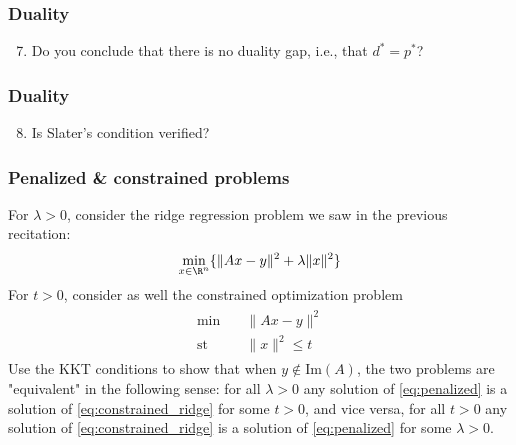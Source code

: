 \documentclass{beamer}
\begin{document}
\begin{frame}[t] 
\frametitle{Duality}
\vspace{-5pt}
\begin{enumerate}
\setcounter{enumi}{6}
\item Do you conclude that there is no duality gap, i.e., that $d^* = p^*$?
\end{enumerate}
\end{frame}

\begin{frame}[t] 
\frametitle{Duality}
\vspace{-5pt}
\begin{enumerate}
\setcounter{enumi}{7}
\item Is Slater's condition verified?
\end{enumerate}
\end{frame}

\begin{frame}[t] 
\frametitle{Penalized \& constrained problems}
\vspace{-5pt}
For $\lambda > 0$, consider the ridge regression problem we saw in the previous recitation:
\vspace{-5pt}
\begin{align} \label{eq:penalized}
\min_{x \in \R^n} \{ \|Ax - y\|^2 + \lambda \|x\|^2 \}
\end{align}
For $t > 0$, consider as well the constrained optimization problem 
\begin{align}
\begin{split} \label{eq:constrained_ridge}
\min \quad &\|Ax - y\|^2 \\
\text{st} \quad &\|x\|^2 \leq t
\end{split}
\end{align}
Use the KKT conditions to show that when $y \notin \text{Im}(A)$, the two problems are "equivalent" in the following sense: for all $\lambda > 0$ any solution of \eqref{eq:penalized} is a solution of \eqref{eq:constrained_ridge} for some $t > 0$, and vice versa, for all $t > 0$ any solution of \eqref{eq:constrained_ridge} is a solution of \eqref{eq:penalized} for some $\lambda > 0$.
\end{frame}


\begin{frame}[t]
\pause
\pause
\pause
\pause
\end{frame}
\end{document}
